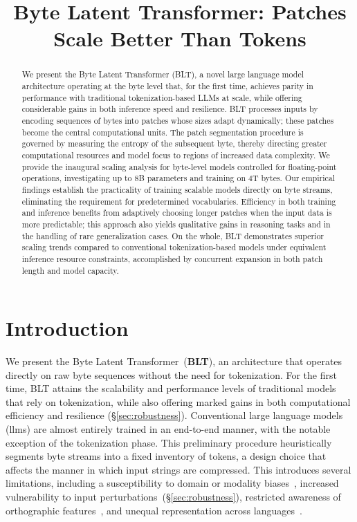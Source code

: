 \title{Byte Latent Transformer: Patches Scale Better Than Tokens}

\begin{abstract}
We present the Byte Latent Transformer (\textsc{BLT}), a novel large language model architecture operating at the byte level that, for the first time, achieves parity in performance with traditional tokenization-based LLMs at scale, while offering considerable gains in both inference speed and resilience.
\textsc{BLT} processes inputs by encoding sequences of bytes into patches whose sizes adapt dynamically; these patches become the central computational units. The patch segmentation procedure is governed by measuring the entropy of the subsequent byte, thereby directing greater computational resources and model focus to regions of increased data complexity. We provide the inaugural scaling analysis for byte-level models controlled for floating-point operations, investigating up to 8B parameters and training on 4T bytes. Our empirical findings establish the practicality of training scalable models directly on byte streams, eliminating the requirement for predetermined vocabularies. Efficiency in both training and inference benefits from adaptively choosing longer patches when the input data is more predictable; this approach also yields qualitative gains in reasoning tasks and in the handling of rare generalization cases. On the whole, \textsc{BLT} demonstrates superior scaling trends compared to conventional tokenization-based models under equivalent inference resource constraints, accomplished by concurrent expansion in both patch length and model capacity.
\end{abstract}

\section{Introduction}
\label{section:intro}

We present the Byte Latent Transformer~(\textbf{BLT}), an architecture that operates directly on raw byte sequences without the need for tokenization. For the first time, BLT attains the scalability and performance levels of traditional models that rely on tokenization, while also offering marked gains in both computational efficiency and resilience (\S\ref{sec:robustness}).  
Conventional large language models (llms) are almost entirely trained in an end-to-end manner, with the notable exception of the tokenization phase. This preliminary procedure heuristically segments byte streams into a fixed inventory of tokens, a design choice that affects the manner in which input strings are compressed. This introduces several limitations, including a susceptibility to domain or modality biases~\citep{dagangetting}, increased vulnerability to input perturbations~(\S\ref{sec:robustness}), restricted awareness of orthographic features~\citep{edman2024cute}, and unequal representation across languages~\citep{liang2023xlm,petrov2024language,limisiewicz2024myte}.

